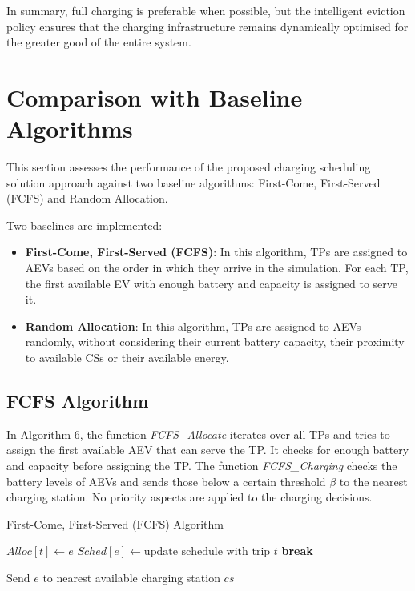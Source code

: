 In summary, full charging is preferable when possible, but the intelligent eviction policy ensures that the charging infrastructure remains dynamically optimised for the greater good of the entire system.

\section{Comparison with Baseline Algorithms}
\label{sec:baseline_comparison}

This section assesses the performance of the proposed charging scheduling solution approach against two baseline algorithms: First-Come, First-Served (FCFS) and Random Allocation. 

Two baselines are implemented:
\begin{itemize}
    \item \textbf{First-Come, First-Served (FCFS)}: In this algorithm, TPs are assigned to AEVs based on the order in which they arrive in the simulation. For each TP, the first available EV with enough battery and capacity is assigned to serve it.
  
    \item \textbf{Random Allocation}: In this algorithm, TPs are assigned to AEVs randomly, without considering their current battery capacity, their proximity to available CSs or their available energy.  
\end{itemize}

\subsection{FCFS Algorithm}

In Algorithm 6, the function \textit{FCFS\_Allocate} iterates over all TPs and tries to assign the first available AEV that can serve the TP. It checks for enough battery and capacity before assigning the TP.
The function\textit{ FCFS\_Charging} checks the battery levels of AEVs and sends those below a certain threshold  $\beta$  to the nearest charging station. No priority aspects are applied to the charging decisions.
\begin{algorithm}
\caption{First-Come, First-Served (FCFS) Algorithm}
\begin{algorithmic}
     
         
             
                \State $Alloc[t] \gets e$
                \State $Sched[e] \gets \text{update schedule with trip } t$
                \State \textbf{break}
            \EndIf
        \EndFor
    \EndFor
\EndFunction

     
         
            \State Send $e$ to nearest available charging station $cs$
        \EndIf
    \EndFor
\EndFunction
\end{algorithmic}
\end{algorithm}


